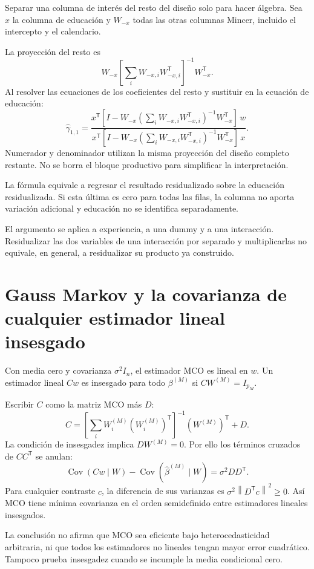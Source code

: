 \documentclass[11pt,a4paper]{article}
\newcommand{\norm}[1]{\left\lVert #1\right\rVert}
\DeclareMathOperator{\Cov}{Cov}
\begin{document}
Separar una columna de interés del resto del diseño solo para hacer álgebra. Sea $x$ la columna de educación y $W_{-x}$ todas las otras columnas Mincer, incluido el intercepto y el calendario.

La proyección del resto es
\[
W_{-x}\left[\sum_iW_{-x,i}W_{-x,i}^{\mathsf T}\right]^{-1}W_{-x}^{\mathsf T}.
\]
Al resolver las ecuaciones de los coeficientes del resto y sustituir en la ecuación de educación:
\[
\widehat\gamma_{1,1}
=\frac{x^{\mathsf T}
[I-W_{-x}(\sum_iW_{-x,i}W_{-x,i}^{\mathsf T})^{-1}W_{-x}^{\mathsf T}]\,w}
{x^{\mathsf T}
[I-W_{-x}(\sum_iW_{-x,i}W_{-x,i}^{\mathsf T})^{-1}W_{-x}^{\mathsf T}]\,x}.
\]
Numerador y denominador utilizan la misma proyección del diseño completo restante. No se borra el bloque productivo para simplificar la interpretación.

La fórmula equivale a regresar el resultado residualizado sobre la educación residualizada. Si esta última es cero para todas las filas, la columna no aporta variación adicional y educación no se identifica separadamente.

El argumento se aplica a experiencia, a una dummy y a una interacción. Residualizar las dos variables de una interacción por separado y multiplicarlas no equivale, en general, a residualizar su producto ya construido.

\clearpage
\section{Gauss Markov y la covarianza de cualquier estimador lineal insesgado}

Con media cero y covarianza $\sigma^2I_n$, el estimador MCO es lineal en $w$. Un estimador lineal $Cw$ es insesgado para todo $\beta^{(M)}$ si $CW^{(M)}=I_{p_M}$.

Escribir $C$ como la matriz MCO más $D$:
\[
C=\left[\sum_iW_i^{(M)}(W_i^{(M)})^{\mathsf T}\right]^{-1}
(W^{(M)})^{\mathsf T}+D.
\]
La condición de insesgadez implica $DW^{(M)}=0$. Por ello los términos cruzados de $CC^{\mathsf T}$ se anulan:
\[
\Cov(Cw\mid W)-\Cov(\widehat\beta^{(M)}\mid W)
=\sigma^2DD^{\mathsf T}.
\]
Para cualquier contraste $c$, la diferencia de sus varianzas es
$\sigma^2\norm{D^{\mathsf T}c}^2\ge0$. Así MCO tiene mínima covarianza en el orden semidefinido entre estimadores lineales insesgados.

La conclusión no afirma que MCO sea eficiente bajo heterocedasticidad arbitraria, ni que todos los estimadores no lineales tengan mayor error cuadrático. Tampoco prueba insesgadez cuando se incumple la media condicional cero.
\end{document}
